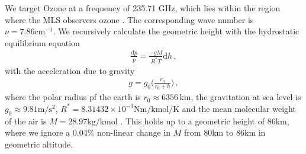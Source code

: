 We target Ozone at a frequency of 235.71 GHz, which lies within the region where the MLS observers ozone \cite{livesey2008ozonecarbonmono, waters2006earth}.
The corresponding wave number is $\nu = 7.86\text{cm}^{-1}$.
We recursively calculate the geometric height with the hydrostatic equilibrium equation
\begin{align}
	\frac{\text{d}p}{p} = \frac{- g M}{R^* T} \text{d} h \, ,\label{eq:hydr}
\end{align}
with the acceleration due to gravity
\begin{align}
	g = g_0 \Bigg( \frac{r_0}{r_0 + h} \Bigg) \, ,
\end{align}
where the polar radius pf the earth is $r_0 \approx 6356 \, \text{km}$, the gravitation at sea level is $g_0 \approx 9.81 \text{m}/\text{s}^2$, $R^* = 8.31432 \times 10^{-3} \text{Nm} / \text{kmol} / \text{K}$ and the mean molecular weight of the air is $M = 28.97 \text{kg/kmol}$ \cite{atmosphere1976us}.
This holds up to a geometric height of $86$km, where we ignore a $0.04\%$ non-linear change in $M$ from $80$km to $86$km in geometric altitude.

